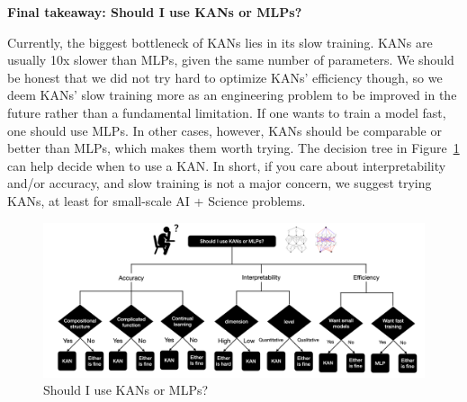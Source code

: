 \documentclass{article}
\numberwithin{equation}{section}
\numberwithin{figure}{section}
\begin{document}
{\bf Final takeaway: Should I use KANs or MLPs?} 

Currently, the biggest bottleneck of KANs lies in its slow training. KANs are usually 10x slower than MLPs, given the same number of parameters. We should be honest that we did not try hard to optimize KANs' efficiency though, so we deem KANs' slow training more as an engineering problem to be improved in the future rather than a fundamental limitation. If one wants to train a model fast, one should use MLPs. In other cases, however, KANs should be comparable or better than MLPs, which makes them worth trying. The decision tree in Figure~\ref{fig:decision-tree} can help decide when to use a KAN. In short, if you care about interpretability and/or accuracy, and slow training is not a major concern, we suggest trying KANs, at least for small-scale AI + Science problems.

\begin{figure}[t]
    \centering
    \includegraphics[width=1\linewidth]{figs/decision_tree.png}
    \caption{Should I use KANs or MLPs?}
    \label{fig:decision-tree}
\end{figure}


\end{document}
